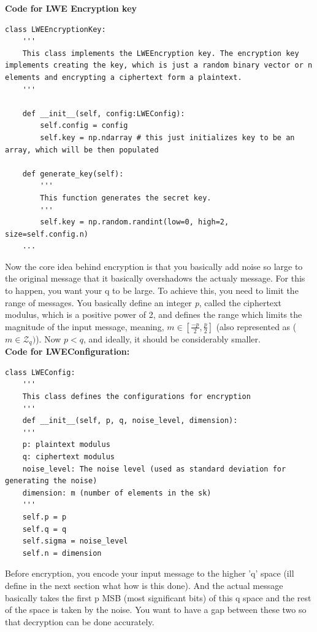 \documentclass{report}
\begin{document}
\textbf{Code for LWE Encryption key}
\begin{verbatim}
class LWEEncryptionKey:
	'''
	This class implements the LWEEncryption key. The encryption key implements creating the key, which is just a random binary vector or n elements and encrypting a ciphertext form a plaintext.
	'''

	def __init__(self, config:LWEConfig):
		self.config = config
		self.key = np.ndarray # this just initializes key to be an array, which will be then populated

	def generate_key(self):
		'''
		This function generates the secret key.
		'''
		self.key = np.random.randint(low=0, high=2, size=self.config.n)
	...
\end{verbatim}

Now the core idea behind encryption is that you basically add noise so large to the original message that it basically overshadows the actualy message. For this to happen, you want your q to be large. To achieve this, you need to limit the range of messages. You basically define an integer \textit{p}, called the ciphertext modulus, which is a positive power of 2, and defines the range which limits the magnitude of the input message, meaning, $m \in [\frac{-p}{2}, \frac{p}{2}]$ (also represented as ($m \in \mathcal{Z}_q)$). Now $p < q$, and ideally, it should be considerably smaller.\newline
\newline\\
\textbf{Code for LWEConfiguration:}
\begin{verbatim}
class LWEConfig:
	'''
	This class defines the configurations for encryption
	'''
	def __init__(self, p, q, noise_level, dimension):
	'''
	p: plaintext modulus
	q: ciphertext modulus
	noise_level: The noise level (used as standard deviation for generating the noise)
	dimension: m (number of elements in the sk)
	'''
	self.p = p
	self.q = q
	self.sigma = noise_level
	self.n = dimension
\end{verbatim}

Before encryption, you encode your input message to the higher 'q' space (ill define in the next section what how is this done). And the actual message basically takes the first p MSB (most significant bits) of this q space and the rest of the space is taken by the noise. You want to have a gap between these two so that decryption can be done accurately.
\end{document}
